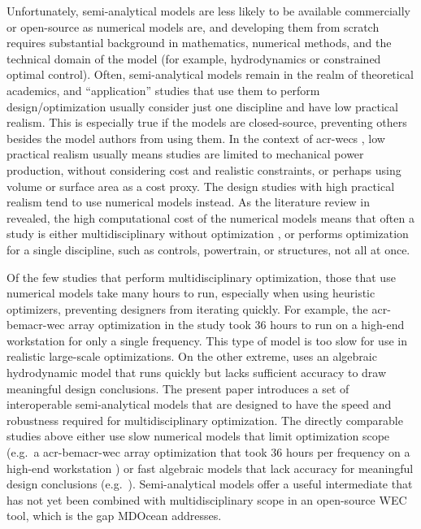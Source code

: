 \documentclass[a4paper,fleqn,colorlinks,unicode,lineno]{cas-dc} %
\providecommand{\DIFaddtex}[1]{{\protect\color{blue}\uwave{#1}}} %
\providecommand{\DIFadd}[1]{\texorpdfstring{\DIFaddtex{#1}}{#1}} %
\begin{document}
    Unfortunately, semi-analytical models are less likely to be available commercially or open-source as numerical models are, and developing them from scratch requires substantial background in mathematics, numerical methods, and the technical domain of the model (for example, hydrodynamics or constrained optimal control).
    Often, semi-analytical models remain in the realm of theoretical academics, and ``application'' studies that use them to perform design/optimization usually consider just one discipline and have low practical realism.
    This is especially true if the models are closed-source, preventing others besides the model authors from using them.
    In the context of \glspl{acr-wec} , low practical realism usually means studies are limited to mechanical power production, without considering cost and realistic constraints, or perhaps using volume or surface area as a cost proxy.
    The design studies with high practical realism tend to use numerical models instead.
    As the literature review in  revealed, the high computational cost of the numerical models means that often a study is either multidisciplinary without optimization \citep{RM3,mi_multi-scale_2025}, or performs optimization for a single discipline, such as controls, powertrain, or structures, not all at once.

    Of the few studies that perform multidisciplinary optimization, those that use numerical models take many hours to run, especially when using heuristic optimizers, preventing designers from iterating quickly.
    For example, the \gls{acr-bem}\DIFadd{-based 4-}\gls{acr-wec} array optimization in the study \citep{khanal_multi-objective_2024} took 36 hours to run on a high-end workstation for only a single frequency.
    This type of model is too slow for use in realistic large-scale optimizations.
    On the other extreme, \citet{mccabe_multidisciplinary_2022} uses an algebraic hydrodynamic model that runs quickly but lacks sufficient accuracy to draw meaningful design conclusions.
    The present paper introduces a set of interoperable semi-analytical models that are designed to have the speed and robustness required for multidisciplinary optimization.
\else
    The directly comparable studies above either use slow numerical models that limit optimization scope (e.g.\ a \gls{acr-bem}\DIFadd{-based 4-}\gls{acr-wec} array optimization that took 36 hours per frequency on a high-end workstation \citep{khanal_multi-objective_2024}) or fast algebraic models that lack accuracy for meaningful design conclusions (e.g.\ \citep{mccabe_multidisciplinary_2022}).
    Semi-analytical models offer a useful intermediate that has not yet been combined with multidisciplinary scope in an open-source WEC tool, which is the gap MDOcean addresses.
\fi
\end{document}
